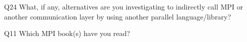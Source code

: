 \begin{description}%
\item{Q24} What, if any, alternatives are you investigating to indirectly call MPI or another communication layer by using another parallel language/library?%
\item{Q11} Which MPI book(s) have you read?%
\end{description}%
